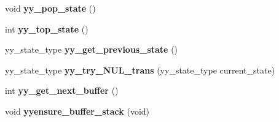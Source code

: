 \begin{DoxyCompactItemize}
\item 
void {\bfseries yy\+\_\+pop\+\_\+state} ()\hypertarget{classyyFlexLexer_a58ea71e548fedec914d814a3e320efe9}{}\label{classyyFlexLexer_a58ea71e548fedec914d814a3e320efe9}

\item 
int {\bfseries yy\+\_\+top\+\_\+state} ()\hypertarget{classyyFlexLexer_aa1ae2fa3798a4d520bc846052207f562}{}\label{classyyFlexLexer_aa1ae2fa3798a4d520bc846052207f562}

\item 
yy\+\_\+state\+\_\+type {\bfseries yy\+\_\+get\+\_\+previous\+\_\+state} ()\hypertarget{classyyFlexLexer_a8e2236ff4238b19413f3d19dc6f5a8dd}{}\label{classyyFlexLexer_a8e2236ff4238b19413f3d19dc6f5a8dd}

\item 
yy\+\_\+state\+\_\+type {\bfseries yy\+\_\+try\+\_\+\+N\+U\+L\+\_\+trans} (yy\+\_\+state\+\_\+type current\+\_\+state)\hypertarget{classyyFlexLexer_ac58babd5c2cb9b7ba0b08cbc0898c89f}{}\label{classyyFlexLexer_ac58babd5c2cb9b7ba0b08cbc0898c89f}

\item 
int {\bfseries yy\+\_\+get\+\_\+next\+\_\+buffer} ()\hypertarget{classyyFlexLexer_a3659121edfbb2d06999b22ca9255fb1a}{}\label{classyyFlexLexer_a3659121edfbb2d06999b22ca9255fb1a}

\item 
void {\bfseries yyensure\+\_\+buffer\+\_\+stack} (void)\hypertarget{classyyFlexLexer_a12af5c2b352914fabe55dfa8b1a77a15}{}\label{classyyFlexLexer_a12af5c2b352914fabe55dfa8b1a77a15}

\end{DoxyCompactItemize}
